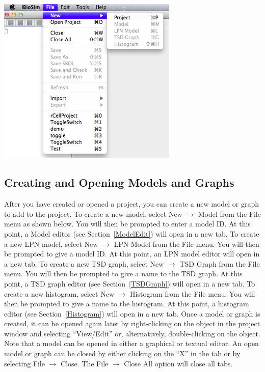 \documentclass[titlepage,11pt]{article}
\begin{document}
\begin{center}
\includegraphics[height=80mm]{screenshots/project}
\end{center}

\clearpage

\subsection{Creating and Opening Models and Graphs}

\noindent
After you have created or opened a project, you can create a new model or graph to add to the project.  To create a new model, select New $\rightarrow$ Model from the File menu as shown below. You will then be prompted to enter a model ID.  At this point, a Model editor (see Section~\ref{ModelEdit}) will open in a new tab.  To create a new LPN model, select New $\rightarrow$ LPN Model from the File menu. You will then be prompted to give a model ID.  At this point, an LPN model editor 
will open in a new tab. To create a new TSD graph, select New $\rightarrow$ TSD Graph from the File menu. You will then be prompted to give a name to the TSD graph.  At this point, a TSD graph editor (see Section~\ref{TSDGraph}) will open in a new tab. To create a new histogram, select New $\rightarrow$ Histogram from the File menu. You will then be prompted to give a name to the histogram.  At this point, a histogram editor (see Section~\ref{Histogram}) will open in a new tab.  Once a model or graph is created, it can be opened again later by right-clicking on the object in the project window and selecting ``View/Edit'' or, alternatively, double-clicking on the object.  Note that a model can be opened in either a graphical or textual editor.  An open model or graph can be closed by either clicking on the ``X'' in the tab or by selecting File $\rightarrow$ Close.  The File $\rightarrow$ Close All option will close all tabs.
\end{document}
